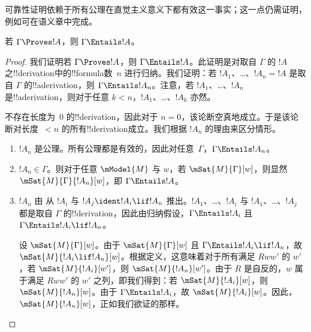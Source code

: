 \documentclass[../../../include/open-logic-section]{subfiles}
\begin{document}


\begin{editorial}
  可靠性证明依赖于所有公理在直觉主义意义下都有效这一事实；这一点仍需证明，例如可在语义章中完成。
\end{editorial}

\begin{thm}[可靠性]
  若 $\Gamma \Proves !A$，则 $\Gamma \Entails !A$。
\end{thm}

\begin{proof}
  我们证明若 $\Gamma \Proves !A$，则 $\Gamma \Entails !A$。此证明是对取自 $\Gamma$ 的 $!A$ 之!!{derivation}中的!!{formula}数~$n$ 进行归纳。我们证明：若 $!A_1$、\dots、$!A_n = !A$ 是取自 $\Gamma$ 的!!a{derivation}，则 $\Gamma \Entails !A_n$。注意，若 $!A_1$、\dots、$!A_n$ 是!!a{derivation}，则对于任意 $k<n$，$!A_1$、\dots、$!A_k$ 亦然。

  不存在长度为~$0$ 的!!{derivation}，因此对于 $n=0$，该论断空真地成立。于是该论断对长度~$<n$ 的所有!!{derivation}成立。我们根据 $!A_n$ 的理由来区分情形。

  \begin{enumerate}
  \item $!A_n$ 是公理。所有公理都是有效的，因此对任意~$\Gamma$，$\Gamma \Entails !A_n$。
  \item $!A_n \in \Gamma$。则对于任意 $\mModel{M}$ 与 $w$，若 $\mSat{M}{\Gamma}[w]$，则显然 $\mSat{M}{\Gamma}{!A_n}[w]$，即 $\Gamma \Entails !A$。
  \item $!A_n$ 由 \MP{} 从 $!A_i$ 与 $!A_j \ident !A_i \lif !A_n$ 推出。$!A_1$、\dots、$!A_i$ 与 $!A_1$、\dots、$!A_j$ 都是取自 $\Gamma$ 的!!{derivation}，因此由归纳假设，$\Gamma \Entails !A_i$ 且 $\Gamma \Entails !A_i \lif !A_n$。

    设 $\mSat{M}{\Gamma}[w]$。由于 $\mSat{M}{\Gamma}[w]$ 且 $\Gamma \Entails !A_i \lif !A_n$，故 $\mSat{M}{!A_i \lif !A_n}[w]$。根据定义，这意味着对于所有满足 $Rww'$ 的 $w'$，若 $\mSat{M}{!A_i}[w']$，则 $\mSat{M}{!A_n}[w']$。由于 $R$ 是自反的，$w$ 属于满足 $Rww'$ 的 $w'$ 之列，即我们得到：若 $\mSat{M}{!A_i}[w]$，则 $\mSat{M}{!A_n}[w]$。由于 $\Gamma \Entails !A_i$，故 $\mSat{M}{!A_i}[w]$。因此，$\mSat{M}{!A_n}[w]$，正如我们欲证的那样。
  \end{enumerate}
\end{proof}
\end{document}
